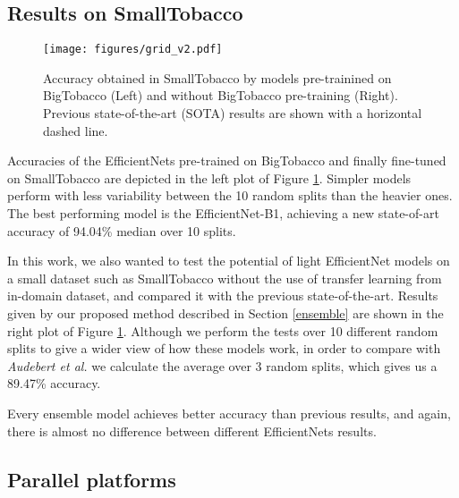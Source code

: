\documentclass[runningheads]{llncs}
\begin{document}
\subsection{Results on SmallTobacco}\label{sec:results_smalltobacco}

\begin{figure}
	\begin{centering}
	\texttt{[image: figures/grid\_v2.pdf]}
	\caption{Accuracy obtained in SmallTobacco by models pre-trainined on BigTobacco (Left) and without BigTobacco pre-training (Right). Previous state-of-the-art (SOTA) results are shown with a horizontal dashed line.}
	\label{fig:finetuning}
	\end{centering}
\end{figure}

Accuracies of the EfficientNets pre-trained on BigTobacco and finally fine-tuned on SmallTobacco are depicted in the left plot of Figure \ref{fig:finetuning}. Simpler models perform with less variability between the 10 random splits than the heavier ones. The best performing model is the EfficientNet-B1, achieving a new state-of-art accuracy of 94.04\% median over 10 splits.

In this work, we also wanted to test the potential of light EfficientNet models on a small dataset such as SmallTobacco without the use of transfer learning from in-domain dataset, and compared it with the previous state-of-the-art. Results given by our proposed method described in Section \ref{ensemble} are shown in the right plot of Figure \ref{fig:finetuning}. Although we perform the tests over 10 different random splits to give a wider view of how these models work, in order to compare with \textit{Audebert et al.} \cite{multimodal} we calculate the average over 3 random splits, which gives us a 89.47\% accuracy.

Every ensemble model achieves better accuracy than previous results, and again, there is almost no difference between different EfficientNets results.

\subsection{Parallel platforms}
\end{document}
